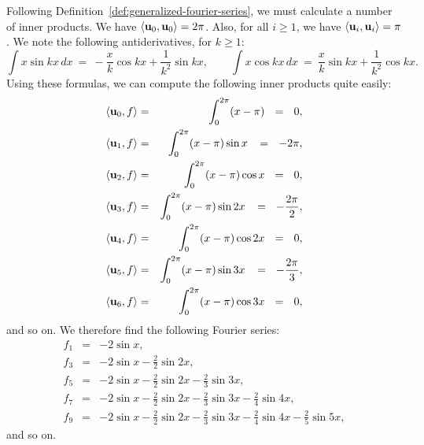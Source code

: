 \begin{solution}
  Following Definition~\ref{def:generalized-fourier-series}, we must
  calculate a number of inner products. We have
  $\iprod{\vect{u}_0,\vect{u}_0}=2\pi$. Also, for all $i\geq 1$, we
  have $\iprod{\vect{u}_i,\vect{u}_i}=\pi$. We note the following
  antiderivatives, for $k\geq 1$:
  \begin{equation*}
    \int x\sin kx\,dx ~=~ -\frac{x}{k}\cos kx + \frac{1}{k^2}\sin kx, \qquad
    \int x\cos kx\,dx ~=~ \frac{x}{k}\sin kx + \frac{1}{k^2}\cos kx.
  \end{equation*}
  Using these formulas, we can compute the following inner products
  quite easily:
  \begin{eqnarray*}
    \iprod{\vect{u}_0, f}
    &=& \int_{0}^{2\pi} (x-\pi)
        ~~=~~ 0, \\
    \iprod{\vect{u}_1, f}
    &=& \int_{0}^{2\pi} (x-\pi)\sin x
        \,~~=~~ -2\pi, \\
    \iprod{\vect{u}_2, f}
    &=& \int_{0}^{2\pi} (x-\pi)\cos x
        ~~=~~ 0, \\
    \iprod{\vect{u}_3, f}
    &=& \int_{0}^{2\pi} (x-\pi)\sin 2x
        \,~~=~~ -\frac{2\pi}{2}, \\
    \iprod{\vect{u}_4, f}
    &=& \int_{0}^{2\pi} (x-\pi)\cos 2x
        ~~=~~ 0, \\
    \iprod{\vect{u}_5, f}
    &=& \int_{0}^{2\pi} (x-\pi)\sin 3x
        \,~~=~~ -\frac{2\pi}{3}, \\
    \iprod{\vect{u}_6, f}
    &=& \int_{0}^{2\pi} (x-\pi)\cos 3x
        ~~=~~ 0,
  \end{eqnarray*}
  and so on. We therefore find the following Fourier series:
  \begin{eqnarray*}
    f_1 &=& -2 \sin x, \\
    f_3 &=& -2 \sin x - \frac{2}{2}\sin 2x, \\
    f_5 &=& -2 \sin x - \frac{2}{2}\sin 2x - \frac{2}{3}\sin 3x, \\
    f_7 &=& -2 \sin x - \frac{2}{2}\sin 2x - \frac{2}{3}\sin 3x - \frac{2}{4}\sin 4x, \\
    f_9 &=& -2 \sin x - \frac{2}{2}\sin 2x - \frac{2}{3}\sin 3x - \frac{2}{4}\sin 4x - \frac{2}{5}\sin 5x,
  \end{eqnarray*}
  and so on.
\end{solution}

